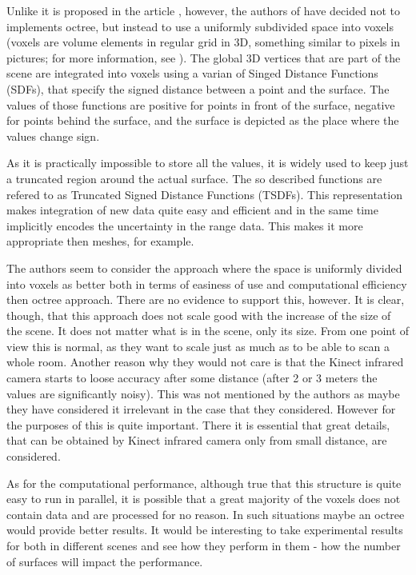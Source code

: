 \documentclass[12pt]{article}
\theoremstyle{plain}
\begin{document}
    Unlike it is proposed in the article
    \cite{representaion-and-rendering-of-implicit-surfaces}, however, the
    authors of \cite{kinectfusion} have decided not to implements octree, but
    instead to use a uniformly subdivided space into voxels (voxels are
    volume elements in regular grid in 3D, something similar to pixels in
    pictures; for more information, see \cite{voxel}). The global 3D vertices
    that are part of the scene are integrated into voxels using a varian of
    Singed Distance Functions (SDFs), that specify the signed distance between a
    point and the surface. The values of those functions are positive for points
    in front of the surface, negative for points behind the surface, and the
    surface is depicted as the place where the values change sign. 

    As it is practically impossible to store all the values, it is widely used
    to keep just a truncated region around the actual surface. The so described
    functions are refered to as Truncated Signed Distance Functions (TSDFs).
    This representation makes integration of new data quite easy and efficient
    and in the same time implicitly encodes the uncertainty in the range data.
    This makes it more appropriate then meshes, for example.

    The authors seem to consider the approach where the space is uniformly
    divided into voxels as better both in terms of easiness of use and
    computational efficiency then octree approach. There are no evidence to
    support this, however. It is clear, though, that this approach does not
    scale good with the increase of the size of the scene. It does not matter
    what is in the scene, only its size. From one point of view this is normal,
    as they want to scale just as much as to be able to scan a whole room.
    Another reason why they would not care is that the Kinect infrared camera
    starts to loose accuracy after some distance (after 2 or 3 meters the values
    are significantly noisy). This was not mentioned by the authors as maybe
    they have considered it irrelevant in the case that they considered. However
    for the purposes of \cite{body-scanning} this is quite important. There it
    is essential that great details, that can be obtained by Kinect infrared
    camera only from small distance, are considered.

    As for the computational performance, although true that this structure is
    quite easy to run in parallel, it is possible that a great majority of the
    voxels does not contain data and are processed for no reason. In such
    situations maybe an octree would provide better results. It would be
    interesting to take experimental results for both in different scenes and
    see how they perform in them - how the number of surfaces will impact the
    performance.
\end{document}
